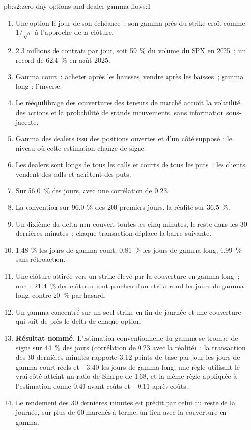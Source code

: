 \begin{solution}{pb:s2:zero-day-options-and-dealer-gamma-flows:1}
\begin{enumerate}
\item Une option le jour de son échéance~; son gamma près du strike croît comme $1/\sqrt\tau$ à l'approche de la clôture.
\item 2.3 millions de contrats par jour, soit 59~\% du volume du SPX en 2025~; un record de 62.4~\% en août 2025.
\item Gamma court~: acheter après les hausses, vendre après les baisses~; gamma long~: l'inverse.
\item Le rééquilibrage des couvertures des teneurs de marché accroît la volatilité des actions et la probabilité de grands mouvements, sans information sous-jacente.
\item Gamma des dealers issu des positions ouvertes et d'un côté supposé~; le niveau où cette estimation change de signe.
\item Les dealers sont longs de tous les calls et courts de tous les puts~: les clients vendent des calls et achètent des puts.
\item Sur 56.0~\% des jours, avec une corrélation de 0.23.
\item La convention sur 96.0~\% des 200 premiers jours, la réalité sur 36.5~\%.
\item Un dixième du delta non couvert toutes les cinq minutes, le reste dans les 30 dernières minutes~; chaque transaction déplace la barre suivante.
\item 1.48~\% les jours de gamma court, 0.81~\% les jours de gamma long, 0.99~\% sans rétroaction.
\item Une clôture attirée vers un strike élevé par la couverture en gamma long~; non~: 21.4~\% des clôtures sont proches d'un strike rond les jours de gamma long, contre 20~\% par hasard.
\item Un gamma concentré sur un seul strike en fin de journée et une couverture qui suit de près le delta de chaque option.
\item \textbf{Résultat nommé.} L'estimation conventionnelle du gamma se trompe de signe sur 44~\% des jours (corrélation de 0.23 avec la réalité)~; la
transaction des 30 dernières minutes rapporte 3.12 points de base par jour les jours de gamma court réels et $-3.40$ les jours de gamma long, une règle utilisant le vrai côté atteint un ratio de Sharpe
de 1.68, et la même règle appliquée à l'estimation donne 0.40 avant coûts et $-0.11$ après coûts.
\item Le rendement des 30 dernières minutes est prédit par celui du reste de la journée, sur plus de 60 marchés à terme, un lien avec la couverture en gamma.

\end{enumerate}
\end{solution}
